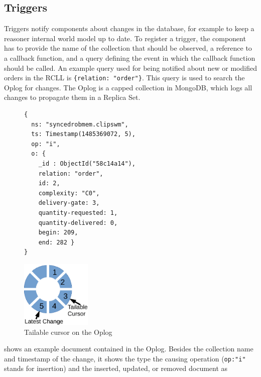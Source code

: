 \subsection{Triggers}
\label{sec:impl-triggers}
Triggers notify components about changes in the database, for example
to keep a reasoner internal world model up to date. To register a trigger,
the component has to provide the name of the
collection that should be observed, a reference to a callback
function, and a query defining the event in which the callback
function should be called. An example query used for being notified
about new or modified orders in the RCLL is \texttt{\{relation:
  "order"\}}. This query is used to search the Oplog for changes. The
Oplog is a capped collection in MongoDB, which logs all changes to
propagate them in a Replica Set.
\begin{figure}
  \vspace{-0.0cm}
\begin{lstlisting}[style=SmallJSON,
  caption={Document in the Oplog},
  label=lst:Oplog,
  framexleftmargin=2pt, xleftmargin=0pt,
 morekeywords={}, numbers=none]
{
  ns: "syncedrobmem.clipswm",
  ts: Timestamp(1485369072, 5),
  op: "i",
  o: {
    _id : ObjectId("58c14a14"),
    relation: "order",
    id: 2,
    complexity: "C0",
    delivery-gate: 3,
    quantity-requested: 1,
    quantity-delivered: 0,
    begin: 209,
    end: 282 }
}
\end{lstlisting}
\vspace{-22mm}
\end{figure}
\begin{figure}
  \centering
  \includegraphics[width=0.3\textwidth]{draw/oplog-cursor}%
  \caption[Tailable cursor on the Oplog]{Tailable cursor on the Oplog}
  \vspace{-4mm}
  \label{fig:oplog-cursor}
\end{figure}
 shows an example document contained in the
Oplog. Besides the collection name and timestamp of the change, it
shows the type the causing operation (\texttt{op:"i"} stands for
insertion) and the inserted, updated, or removed document as
